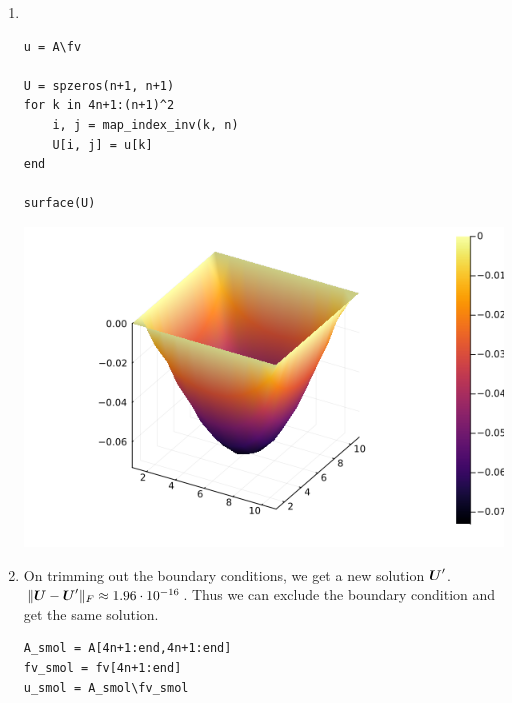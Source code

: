\documentclass[]{exam}
\begin{document}
\begin{questions}
\begin{enumerate}[label=\arabic*.]
\begin{lstlisting}
function map_index(i::Integer, j::Integer, n::Integer)
	if 1 < i < n+1 && 1 < j < n+1
		return 4n + (i - 2)*(n-1) + j-1
	elseif i == 1
		return j
	elseif i == n+1
		return n + 1 + j
	elseif j == 1
		return 2(n+1) + i - 1
	elseif j == n+1
		return 2(n+1) + n - 2 + i
	end
end

function map_index_inv(k::Integer, n::Integer)
	if k <= n+1
		return 1, k
	elseif k <= 2(n+1)
		return n + 1, k - (n+1)
	elseif k < 2(n+1) + n
		return k - 2(n + 1) + 1, 1
	elseif k <= 4n
		return k - 2(n + 1) - n + 2, n + 1
	else
		return div(k-1 - 4n, n-1) + 2, (k-1 - 4n)%(n-1) + 2
	end
end

function laplacian(n::Integer, f::Function)
	A = sparse(1I, (n+1)^2, (n+1)^2)
	A[diagind(A)[4n+1:end]] .= -4

	fvec = zeros((n+1)^2)

	global row_index = 4n + 1
	for i in 2:n
		for j in 2:n
			A[row_index, map_index(i-1, j, n)] = 1
			A[row_index, map_index(i+1, j, n)] = 1
			A[row_index, map_index(i, j-1, n)] = 1
			A[row_index, map_index(i, j+1, n)] = 1
			fvec[row_index] = f(i, j)

			global row_index += 1
		end
	end

	return A, fvec/n^2
end

n = 10
A, fv = laplacian(n, (x, y) -> 1)
		\end{lstlisting}
	\item ~
		\begin{lstlisting}
u = A\fv

U = spzeros(n+1, n+1)
for k in 4n+1:(n+1)^2
	i, j = map_index_inv(k, n)
	U[i, j] = u[k]
end

surface(U)
		\end{lstlisting}
		\begin{center}
			\includegraphics[width=.5\textwidth]{code/q7.png}
		\end{center}
	\item On trimming out the boundary conditions, we get a new solution $\boldsymbol{U}'$. $\|\boldsymbol{U} - \boldsymbol{U}' \|_F \approx 1.96 \cdot 10^{-16}$. Thus we can exclude the boundary condition and get the same solution.
		\begin{lstlisting}
A_smol = A[4n+1:end,4n+1:end]
fv_smol = fv[4n+1:end]
u_smol = A_smol\fv_smol


\end{lstlisting}
\end{enumerate}
\end{questions}
\end{document}
